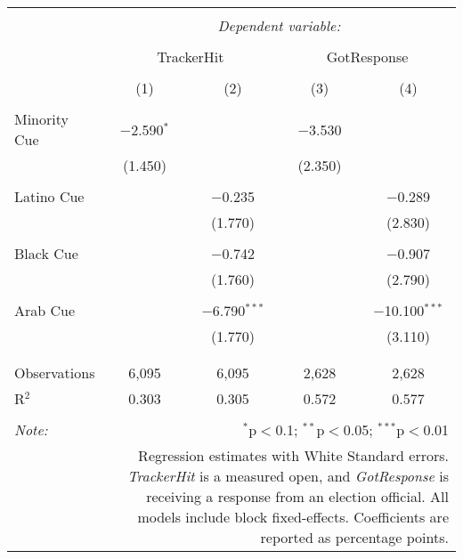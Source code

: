 
\begin{table}[!htbp] \centering 
  \caption{} 
  \label{} 
\begin{tabular}{@{\extracolsep{5pt}}lcccc} 
\\[-1.8ex]\hline 
\hline \\[-1.8ex] 
 & \multicolumn{4}{c}{\textit{Dependent variable:}} \\ 
\cline{2-5} 
\\[-1.8ex] & \multicolumn{2}{c}{TrackerHit} & \multicolumn{2}{c}{GotResponse} \\ 
\\[-1.8ex] & (1) & (2) & (3) & (4)\\ 
\hline \\[-1.8ex] 
 Minority Cue & $-$2.590$^{*}$ &  & $-$3.530 &  \\ 
  & (1.450) &  & (2.350) &  \\ 
  & & & & \\ 
 Latino Cue &  & $-$0.235 &  & $-$0.289 \\ 
  &  & (1.770) &  & (2.830) \\ 
  & & & & \\ 
 Black Cue &  & $-$0.742 &  & $-$0.907 \\ 
  &  & (1.760) &  & (2.790) \\ 
  & & & & \\ 
 Arab Cue &  & $-$6.790$^{***}$ &  & $-$10.100$^{***}$ \\ 
  &  & (1.770) &  & (3.110) \\ 
  & & & & \\ 
\hline \\[-1.8ex] 
Observations & 6,095 & 6,095 & 2,628 & 2,628 \\ 
R$^{2}$ & 0.303 & 0.305 & 0.572 & 0.577 \\ 
\hline 
\hline \\[-1.8ex] 
\textit{Note:}  & \multicolumn{4}{r}{$^{*}$p$<$0.1; $^{**}$p$<$0.05; $^{***}$p$<$0.01} \\ 
 & \multicolumn{4}{r}{Regression estimates with White Standard errors. \textit{TrackerHit} is a measured open, and \textit{GotResponse} is receiving a response from an election official. All models include block fixed-effects. Coefficients are reported as percentage points.} \\ 
\end{tabular} 
\end{table} 
